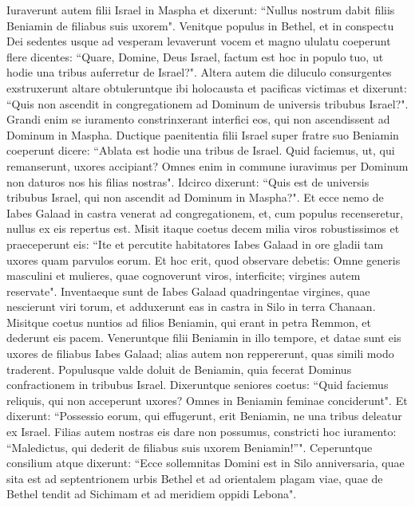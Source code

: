 \begin{biblechapter}  
\verse Iuraverunt autem filii Israel in Maspha et dixerunt: “Nullus nostrum dabit filiis Beniamin de filiabus suis uxorem". 
\verse Venitque populus in Bethel, et in conspectu Dei sedentes usque ad vesperam levaverunt vocem et magno ululatu coeperunt flere dicentes: 
\verse “Quare, Domine, Deus Israel, factum est hoc in populo tuo, ut hodie una tribus auferretur de Israel?". 
\verse Altera autem die diluculo consurgentes exstruxerunt altare obtuleruntque ibi holocausta et pacificas victimas 
\verse et dixerunt: “Quis non ascendit in congregationem ad Dominum de universis tribubus Israel?". Grandi enim se iuramento constrinxerant interfici eos, qui non ascendissent ad Dominum in Maspha. 
\verse Ductique paenitentia filii Israel super fratre suo Beniamin coeperunt dicere: “Ablata est hodie una tribus de Israel. 
\verse Quid faciemus, ut, qui remanserunt, uxores accipiant? Omnes enim in commune iuravimus per Dominum non daturos nos his filias nostras". 
\verse Idcirco dixerunt: “Quis est de universis tribubus Israel, qui non ascendit ad Dominum in Maspha?". Et ecce nemo de Iabes Galaad in castra venerat ad congregationem, 
\verse et, cum populus recenseretur, nullus ex eis repertus est. 
\verse Misit itaque coetus decem milia viros robustissimos et praeceperunt eis: “Ite et percutite habitatores Iabes Galaad in ore gladii tam uxores quam parvulos eorum. 
\verse Et hoc erit, quod observare debetis: Omne generis masculini et mulieres, quae cognoverunt viros, interficite; virgines autem reservate". 
\verse Inventaeque sunt de Iabes Galaad quadringentae virgines, quae nescierunt viri torum, et adduxerunt eas in castra in Silo in terra Chanaan. 
\verse Misitque coetus nuntios ad filios Beniamin, qui erant in petra Remmon, et dederunt eis pacem. 
\verse Veneruntque filii Beniamin in illo tempore, et datae sunt eis uxores de filiabus Iabes Galaad; alias autem non reppererunt, quas simili modo traderent. 
\verse Populusque valde doluit de Beniamin, quia fecerat Dominus confractionem in tribubus Israel. 
\verse Dixeruntque seniores coetus: “Quid faciemus reliquis, qui non acceperunt uxores? Omnes in Beniamin feminae conciderunt". 
\verse Et dixerunt: “Possessio eorum, qui effugerunt, erit Beniamin, ne una tribus deleatur ex Israel. 
\verse Filias autem nostras eis dare non possumus, constricti hoc iuramento: “Maledictus, qui dederit de filiabus suis uxorem Beniamin!”". 
\verse Ceperuntque consilium atque dixerunt: “Ecce sollemnitas Domini est in Silo anniversaria, quae sita est ad septentrionem urbis Bethel et ad orientalem plagam viae, quae de Bethel tendit ad Sichimam et ad meridiem oppidi Lebona". 

\end{biblechapter}
